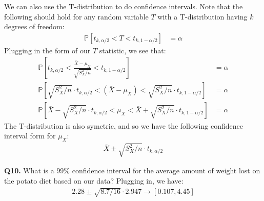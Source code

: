 \documentclass[12pt]{article}
\newcommand{\Prob}{\mathbb{P}}
\newcommand{\cblack}{\color{Black}}
\newcommand{\cblue}{\color{MidnightBlue}}
\begin{document}
We can also use the T-distribution to do confidence intervals. Note that the
following should hold for any random variable $T$ with a T-distribution having
$k$ degrees of freedom:
\begin{align*}
\Prob \left[ t_{k, \alpha/2} < T < t_{k, 1 - \alpha/2} \right] &= \alpha
\end{align*}
Plugging in the form of our $T$ statistic, we see that:
\begin{align*}
\Prob \left[ t_{k, \alpha/2} < \frac{\bar{X} - \mu_X}{\sqrt{S_X^2 / n}} < t_{k, 1 - \alpha/2} \right] &= \alpha \\
\Prob \left[ \sqrt{S_X^2 / n} \cdot t_{k, \alpha/2} < (\bar{X} - \mu_X) < \sqrt{S_X^2 / n} \cdot t_{k, 1 - \alpha/2} \right] &= \alpha \\
\Prob \left[ \bar{X} - \sqrt{S_X^2 / n} \cdot t_{k, \alpha/2} < \mu_X < \bar{X} + \sqrt{S_X^2 / n} \cdot t_{k, 1 - \alpha/2} \right] &= \alpha
\end{align*}
The T-distribution is also symetric, and so we have the following
confidence interval form for $\mu_X$:
\begin{align*}
\bar{X} \pm \sqrt{S_X^2 / n} \cdot t_{k, \alpha/2}
\end{align*}

\textbf{Q10.} What is a $99$\% confidence interval for the average amount of
weight lost on the potato diet based on our data? \cblue Plugging in, we have:
\begin{align*}
2.28 \pm \sqrt{8.7 / 16} \cdot 2.947 \rightarrow [0.107, 4.45]
\end{align*}
\cblack
\end{document}
